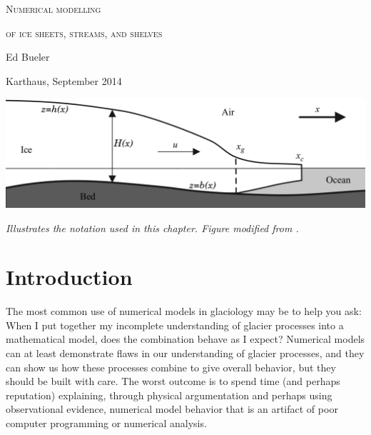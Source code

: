 \documentclass[letterpaper,final,12pt,reqno]{amsart}
\begin{document}
\graphicspath{{../photos/}{../pdffigs/}}

\begin{titlepage}

  \begin{center}
  \phantom{foo}
    \vspace{1.0cm}

     {\Large \textsc{Numerical modelling}}
    \vspace{0.7cm}

     {\Large \textsc{of ice sheets, streams, and shelves}}

    \vspace{1.5cm}

    {\large Ed Bueler}
    \vspace{1cm}

    Karthaus, September 2014

    \vfill
    
    \includegraphics[width=6.0in]{flowline}
  
    \scriptsize \emph{Illustrates the notation used in this chapter.  Figure modified from \cite{SchoofMarine1}.} \normalsize
    
    \vspace{1.5in}
  \end{center}
\end{titlepage}

\clearpage\newpage

\section{Introduction}

The most common use of numerical models in glaciology may be to help you ask: When I put together my incomplete understanding of glacier processes into a mathematical model, does the combination behave as I expect?  Numerical models can at least demonstrate flaws in our understanding of glacier processes, and they can show us how these processes combine to give overall behavior, but they should be built with care.  The worst outcome is to spend time (and perhaps reputation) explaining, through physical argumentation and perhaps using observational evidence, numerical model behavior that is an artifact of poor computer programming or numerical analysis.
\end{document}
